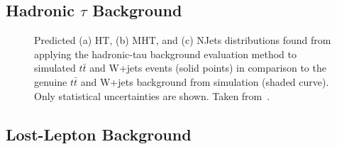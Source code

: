 \subsection{Hadronic $\tau$ Background}
\label{subsec:RA2_tauhad}

\begin{figure}[!h]
  \centering
{}
  \caption{Predicted (a) HT, (b) MHT, and (c) NJets distributions found from applying the hadronic-tau background evaluation method to simulated $t\bar{t}$ and W+jets events (solid points) in comparison to the genuine $t\bar{t}$ and W+jets background from simulation (shaded curve). Only statistical uncertainties are shown. Taken from~\cite{Chatrchyan:2014lfa}.}
  \label{fig:ra2_tauhad}
\end{figure}

\subsection{Lost-Lepton Background}
\label{subsec:RA2_lostlepton}

